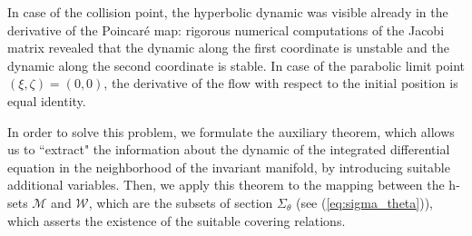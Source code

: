 \documentclass[1p]{article}
\begin{document}
In case of the collision point, the hyperbolic dynamic was visible already in the derivative of the Poincar\'e map: rigorous numerical computations of the Jacobi matrix revealed that the dynamic along the first coordinate is unstable and the dynamic along the second coordinate is stable. In case of the parabolic limit point $(\xi, \zeta) = (0,0)$, the derivative of the flow with respect to the initial position is equal identity.

In order to solve this problem, we formulate the auxiliary theorem, which allows us to ``extract" the information about the dynamic of the integrated differential equation in the neighborhood of the invariant manifold, by introducing suitable additional variables. Then, we apply this theorem to the mapping between the h-sets $\mathcal{M}$ and $\mathcal{W}$, which are the subsets of section $\Sigma_\theta$ (see (\ref{eq:sigma_theta})), which asserts the existence of the suitable covering relations.
\end{document}
